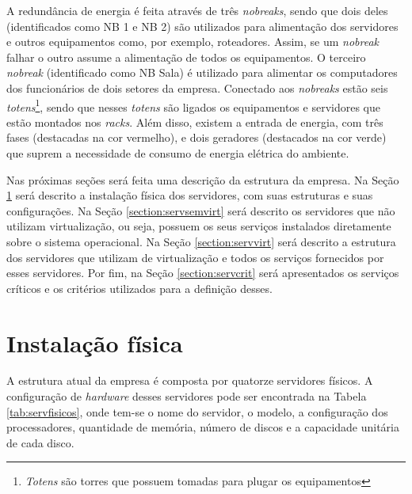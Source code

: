 A redundância de energia é feita através de três \textit{nobreaks}, sendo que dois deles (identificados como NB 1 e NB 2) são utilizados para 
alimentação dos servidores e outros equipamentos como, por exemplo, roteadores. Assim, se um \textit{nobreak} falhar o outro assume a alimentação
de todos os equipamentos. O terceiro \textit{nobreak} (identificado como NB Sala) é utilizado para alimentar os computadores dos funcionários de 
dois setores da empresa. Conectado aos \textit{nobreaks} estão seis \textit{totens}\footnote[1]{\textit{Totens} são torres que possuem tomadas para plugar 
os equipamentos}, sendo que nesses \textit{totens} são ligados os equipamentos e servidores que estão montados nos \textit{racks}. 
Além disso, existem a entrada de energia, com três fases (destacadas na cor vermelho), e dois geradores (destacados na cor verde) que suprem a 
necessidade de consumo de energia elétrica do ambiente.

Nas próximas seções será feita uma descrição da estrutura da empresa. Na Seção \ref{section:fisico} será descrito a instalação física dos 
servidores, com suas estruturas e suas configurações. Na Seção \ref{section:servsemvirt} será descrito os servidores que não utilizam virtualização,
ou seja, possuem os seus serviços instalados diretamente sobre o sistema operacional. Na Seção \ref{section:servvirt} será descrito a estrutura 
dos servidores que utilizam de virtualização e todos os serviços fornecidos por esses servidores. Por fim, na Seção \ref{section:servcrit} será 
apresentados os serviços críticos e os critérios utilizados para a definição desses.

\section{Instalação física}
\label{section:fisico}

A estrutura atual da empresa é composta por quatorze servidores físicos. A configuração de \textit{hardware} desses servidores pode ser 
encontrada na Tabela \ref{tab:servfisicos}, onde tem-se o nome do servidor, o modelo, a configuração dos processadores, quantidade de memória, 
número de discos e a capacidade unitária de cada disco.

